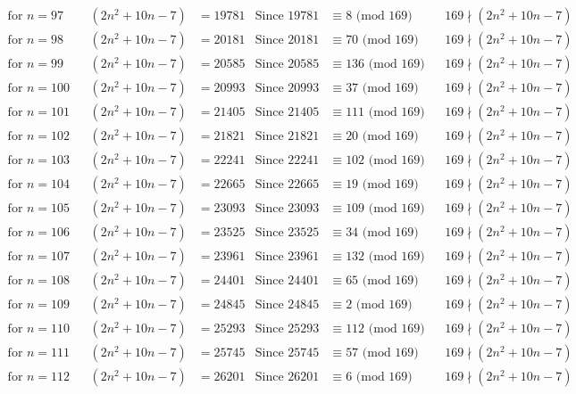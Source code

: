 \documentclass[12pt]{article}
\begin{document}
\begin{align*}
\text{for $n = 97 $}&& (2n^2+10n-7) &= 19781 & \text{Since } 19781  &\equiv  8 \text{ (mod $169$)}&& 169 \nmid (2n^2+10n-7)\\
\text{for $n = 98 $}&& (2n^2+10n-7) &= 20181 & \text{Since } 20181  &\equiv  70 \text{ (mod $169$)}&& 169 \nmid (2n^2+10n-7)\\
\text{for $n = 99 $}&& (2n^2+10n-7) &= 20585 & \text{Since } 20585  &\equiv  136 \text{ (mod $169$)}&& 169 \nmid (2n^2+10n-7)\\
\text{for $n = 100 $}&& (2n^2+10n-7) &= 20993 & \text{Since } 20993  &\equiv  37 \text{ (mod $169$)}&& 169 \nmid (2n^2+10n-7)\\
\text{for $n = 101 $}&& (2n^2+10n-7) &= 21405 & \text{Since } 21405  &\equiv  111 \text{ (mod $169$)}&& 169 \nmid (2n^2+10n-7)\\
\text{for $n = 102 $}&& (2n^2+10n-7) &= 21821 & \text{Since } 21821  &\equiv  20 \text{ (mod $169$)}&& 169 \nmid (2n^2+10n-7)\\
\text{for $n = 103 $}&& (2n^2+10n-7) &= 22241 & \text{Since } 22241  &\equiv  102 \text{ (mod $169$)}&& 169 \nmid (2n^2+10n-7)\\
\text{for $n = 104 $}&& (2n^2+10n-7) &= 22665 & \text{Since } 22665  &\equiv  19 \text{ (mod $169$)}&& 169 \nmid (2n^2+10n-7)\\
\text{for $n = 105 $}&& (2n^2+10n-7) &= 23093 & \text{Since } 23093  &\equiv  109 \text{ (mod $169$)}&& 169 \nmid (2n^2+10n-7)\\
\text{for $n = 106 $}&& (2n^2+10n-7) &= 23525 & \text{Since } 23525  &\equiv  34 \text{ (mod $169$)}&& 169 \nmid (2n^2+10n-7)\\
\text{for $n = 107 $}&& (2n^2+10n-7) &= 23961 & \text{Since } 23961  &\equiv  132 \text{ (mod $169$)}&& 169 \nmid (2n^2+10n-7)\\
\text{for $n = 108 $}&& (2n^2+10n-7) &= 24401 & \text{Since } 24401  &\equiv  65 \text{ (mod $169$)}&& 169 \nmid (2n^2+10n-7)\\
\text{for $n = 109 $}&& (2n^2+10n-7) &= 24845 & \text{Since } 24845  &\equiv  2 \text{ (mod $169$)}&& 169 \nmid (2n^2+10n-7)\\
\text{for $n = 110 $}&& (2n^2+10n-7) &= 25293 & \text{Since } 25293  &\equiv  112 \text{ (mod $169$)}&& 169 \nmid (2n^2+10n-7)\\
\text{for $n = 111 $}&& (2n^2+10n-7) &= 25745 & \text{Since } 25745  &\equiv  57 \text{ (mod $169$)}&& 169 \nmid (2n^2+10n-7)\\
\text{for $n = 112 $}&& (2n^2+10n-7) &= 26201 & \text{Since } 26201  &\equiv  6 \text{ (mod $169$)}&& 169 \nmid (2n^2+10n-7)\\

\end{align*}
\end{document}
